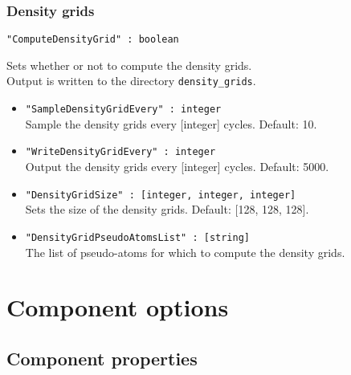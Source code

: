 \subsubsection{Density grids}
\begin{framed}
\verb+"ComputeDensityGrid" : boolean+
\end{framed}
Sets whether or not to compute the density grids.\\
Output is written to the directory \verb+density_grids+.
\begin{itemize}
\item{\verb+"SampleDensityGridEvery" : integer+}\\
Sample the density grids every [integer] cycles. Default: 10.
\item{\verb+"WriteDensityGridEvery" : integer+}\\
Output the density grids every [integer] cycles. Default: 5000.
\item{\verb+"DensityGridSize" : [integer, integer, integer]+}\\
Sets the size of the density grids. Default: [128, 128, 128].
\item{\verb+"DensityGridPseudoAtomsList" : [string]+}\\
The list of pseudo-atoms for which to compute the density grids.
\end{itemize}



\section{Component options}

\subsection{Component properties}

